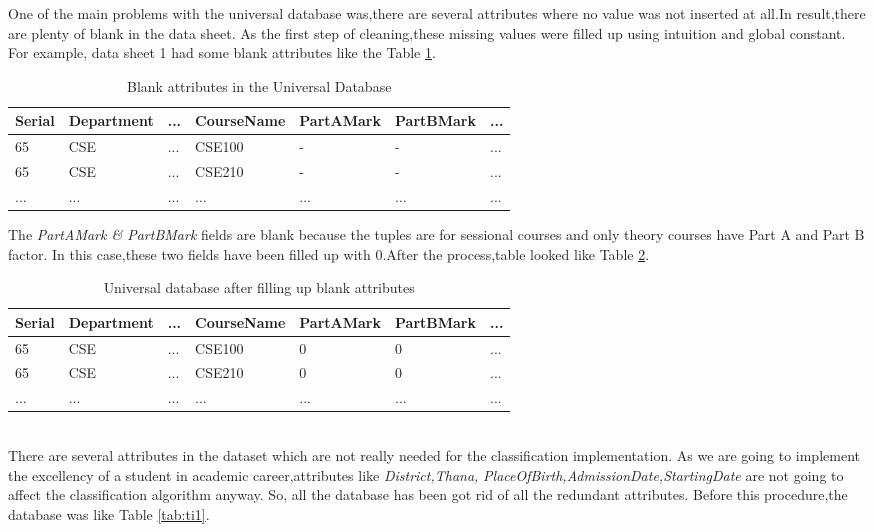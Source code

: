  One of the main problems with the universal database was,there are several attributes where no value was not inserted at all.In result,there are plenty of blank in the data sheet. As the first step of cleaning,these missing values were filled up using intuition and global constant. For example, data sheet 1 had some blank attributes like the Table \ref{tab:tit0}.
\begin {table}[H]
\caption {Blank attributes in the Universal Database} \label{tab:tit0}
\begin{center}
\begin{tabular}{ | m{1cm} | m{2cm}| m{0.5cm}| m{2cm} | m{2cm} | m{2cm} |  m{0.5cm} | } 
\hline
Serial & Department & ... & CourseName & PartAMark & PartBMark & ... \\ 
\hline
65 & CSE & ... & CSE100 & - & - & ... \\ 
\hline
65 & CSE & ... & CSE210 & - & - & ... \\ 
\hline
... & ... & ... & ... & ... & ... & ... \\ 
\hline
\end{tabular}
\end{center}
\end{table}
The \textit{PartAMark \& PartBMark} fields are blank because the tuples are for sessional courses and only theory courses have Part A and Part B factor. \newline
In this case,these two fields have been filled up with 0.After the process,table looked like Table \ref{tab:title0}.
\begin {table}[H]
\caption {Universal database after filling up blank attributes} \label{tab:title0}
\begin{center}
\begin{tabular}{ | m{1cm} | m{2cm}| m{0.5cm}| m{2cm} | m{2cm} | m{2cm} |  m{0.5cm} | } 
\hline
Serial & Department & ... & CourseName & PartAMark & PartBMark & ... \\ 
\hline
65 & CSE & ... & CSE100 & 0 & 0 & ... \\ 
\hline
65 & CSE & ... & CSE210 & 0 & 0 & ... \\ 
\hline
... & ... & ... & ... & ... & ... & ... \\ 
\hline
\end{tabular}
\end{center}
\end{table}
\\There are several attributes in the dataset which are not really needed for the classification implementation. As we are going to implement the excellency of a student in academic career,attributes like \textit{District,Thana,} \textit{PlaceOfBirth,AdmissionDate,StartingDate} are not going to affect the classification algorithm anyway. So, all the database has been got rid of all the redundant attributes. Before this procedure,the database was like Table \ref{tab:ti1}.
